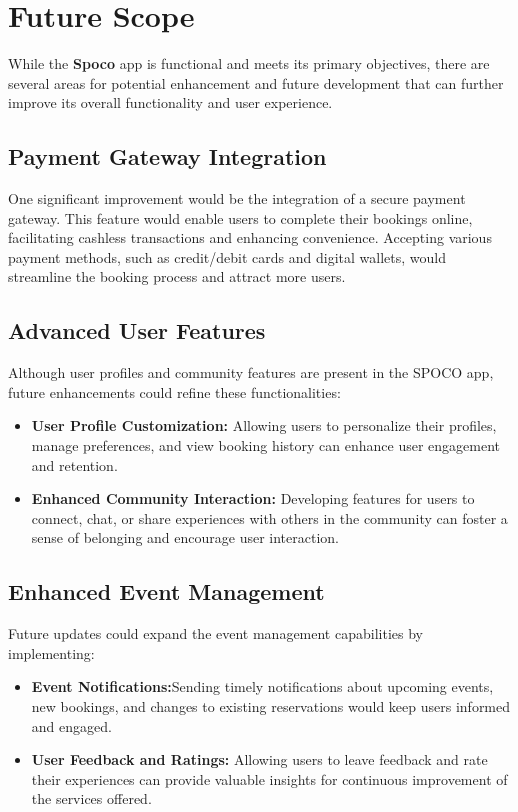 \documentclass[12pt,a4paper]{report}
\begin{document}
\section{Future Scope}
While the \textbf{Spoco} app is functional and meets its primary objectives, there are several areas for potential enhancement and future development that can further improve its overall functionality and user experience.
\subsection{Payment Gateway Integration}
One significant improvement would be the integration of a secure payment gateway. This feature would enable users to complete their bookings online, facilitating cashless transactions and enhancing convenience. Accepting various payment methods, such as credit/debit cards and digital wallets, would streamline the booking process and attract more users.

\subsection{Advanced User Features}
Although user profiles and community features are present in the SPOCO app, future enhancements could refine these functionalities:
\begin{itemize}
    \item \textbf{User Profile Customization:} Allowing users to personalize their profiles, manage preferences, and view booking history can enhance user engagement and retention.
    \item \textbf{Enhanced Community Interaction: } Developing features for users to connect, chat, or share experiences with others in the community can foster a sense of belonging and encourage user interaction.
\end{itemize}


\subsection{Enhanced Event Management}
Future updates could expand the event management capabilities by implementing:
\begin{itemize}
    \item \textbf{Event Notifications:}Sending timely notifications about upcoming events, new bookings, and changes to existing reservations would keep users informed and engaged.
    \item \textbf{User Feedback and Ratings: } Allowing users to leave feedback and rate their experiences can provide valuable insights for continuous improvement of the services offered.
\end{itemize}
\end{document}
